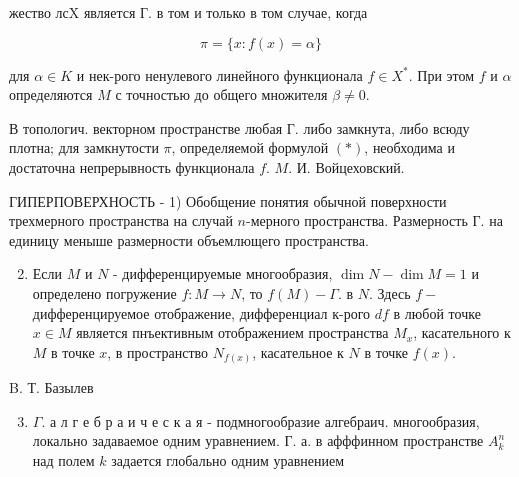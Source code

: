\documentclass[10pt]{article}
\begin{document}
жество лсX является Г. в том и только в том случае, когда



\[

\pi=\{x: f(x)=\alpha\}

\]



для $\alpha \in K$ и нек-рого ненулевого линейного функционала $f \in X^{*}$. При этом $f$ и $\alpha$ определяются $M$ с точностью до общего множителя $\beta \neq 0$.



В топологич. векторном пространстве любая Г. либо замкнута, либо всюду плотна; для замкнутости $\pi$, определяемой формулой $(*)$, необходима и достаточна непрерывность функционала $f$. $M$. И. Войцеховский.



ГИПЕРПОВЕРХНОСТЬ - 1) Обобщение понятия обычной поверхности трехмерного пространства на случай $n$-мерного пространства. Размерность $Г$. на единицу меныше размерности объемлющего пространства.



\begin{enumerate}

  \setcounter{enumi}{1}

  \item Если $M$ и $N$ - дифференцируемые многообразия, $\operatorname{dim} N-\operatorname{dim} M=1$ и определено погружение $f: M \rightarrow N$, то $f(M)-\Gamma$. в $N$. Здесь $f-$ дифференцируемое отображение, дифференциал к-рого $d f$ в любой точке $x \in M$ является пнъективным отображением пространства $M_{x}$, касательного к $M$ в точке $x$, в пространство $N_{f(x)}$, касательное к $N$ в точке $f(x)$.

\end{enumerate}



B. Т. Базылев



\begin{enumerate}

  \setcounter{enumi}{2}

  \item $\Gamma$. а л г е б р а и ч е с к а я - подмногообразие алгебраич. многообразия, локально задаваемое одним уравнением. Г. а. в афффинном пространстве $A_{k}^{n}$ над полем $k$ задается глобально одним уравнением

\end{enumerate}
\end{document}

